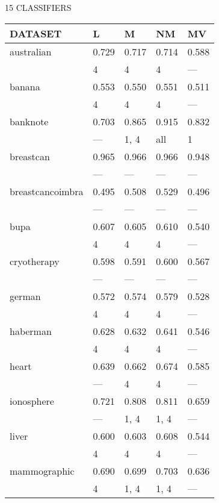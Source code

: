 15 CLASSIFIERS
\begin{tabular}{lllll}
\toprule
 DATASET          & L     & M     & NM    & MV    \\
\midrule
 australian       & 0.729 & 0.717 & 0.714 & 0.588 \\
                  & 4     & 4     & 4     & ---   \\
 banana           & 0.553 & 0.550 & 0.551 & 0.511 \\
                  & 4     & 4     & 4     & ---   \\
 banknote         & 0.703 & 0.865 & 0.915 & 0.832 \\
                  & ---   & 1, 4  & all   & 1     \\
 breastcan        & 0.965 & 0.966 & 0.966 & 0.948 \\
                  & ---   & ---   & ---   & ---   \\
 breastcancoimbra & 0.495 & 0.508 & 0.529 & 0.496 \\
                  & ---   & ---   & ---   & ---   \\
 bupa             & 0.607 & 0.605 & 0.610 & 0.540 \\
                  & 4     & 4     & 4     & ---   \\
 cryotherapy      & 0.598 & 0.591 & 0.600 & 0.567 \\
                  & ---   & ---   & ---   & ---   \\
 german           & 0.572 & 0.574 & 0.579 & 0.528 \\
                  & 4     & 4     & 4     & ---   \\
 haberman         & 0.628 & 0.632 & 0.641 & 0.546 \\
                  & 4     & 4     & 4     & ---   \\
 heart            & 0.639 & 0.662 & 0.674 & 0.585 \\
                  & ---   & 4     & 4     & ---   \\
 ionosphere       & 0.721 & 0.808 & 0.811 & 0.659 \\
                  & ---   & 1, 4  & 1, 4  & ---   \\
 liver            & 0.600 & 0.603 & 0.608 & 0.544 \\
                  & 4     & 4     & 4     & ---   \\
 mammographic     & 0.690 & 0.699 & 0.703 & 0.636 \\
                  & 4     & 1, 4  & 1, 4  & ---   \\

\end{tabular}
